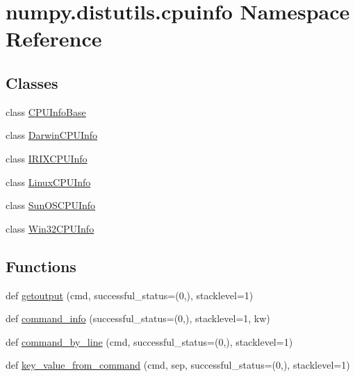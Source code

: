 \hypertarget{namespacenumpy_1_1distutils_1_1cpuinfo}{}\section{numpy.\+distutils.\+cpuinfo Namespace Reference}
\label{namespacenumpy_1_1distutils_1_1cpuinfo}
\subsection*{Classes}
\begin{DoxyCompactItemize}
\item 
class \hyperlink{classnumpy_1_1distutils_1_1cpuinfo_1_1CPUInfoBase}{C\+P\+U\+Info\+Base}
\item 
class \hyperlink{classnumpy_1_1distutils_1_1cpuinfo_1_1DarwinCPUInfo}{Darwin\+C\+P\+U\+Info}
\item 
class \hyperlink{classnumpy_1_1distutils_1_1cpuinfo_1_1IRIXCPUInfo}{I\+R\+I\+X\+C\+P\+U\+Info}
\item 
class \hyperlink{classnumpy_1_1distutils_1_1cpuinfo_1_1LinuxCPUInfo}{Linux\+C\+P\+U\+Info}
\item 
class \hyperlink{classnumpy_1_1distutils_1_1cpuinfo_1_1SunOSCPUInfo}{Sun\+O\+S\+C\+P\+U\+Info}
\item 
class \hyperlink{classnumpy_1_1distutils_1_1cpuinfo_1_1Win32CPUInfo}{Win32\+C\+P\+U\+Info}
\end{DoxyCompactItemize}
\subsection*{Functions}
\begin{DoxyCompactItemize}
\item 
def \hyperlink{namespacenumpy_1_1distutils_1_1cpuinfo_ae7352db161b2168010c670cbb63da285}{getoutput} (cmd, successful\+\_\+status=(0,), stacklevel=1)
\item 
def \hyperlink{namespacenumpy_1_1distutils_1_1cpuinfo_a89d1723389bda494601ebabd79451be1}{command\+\_\+info} (successful\+\_\+status=(0,), stacklevel=1, kw)
\item 
def \hyperlink{namespacenumpy_1_1distutils_1_1cpuinfo_aeb25608a6416293178e3a489a1bab11c}{command\+\_\+by\+\_\+line} (cmd, successful\+\_\+status=(0,), stacklevel=1)
\item 
def \hyperlink{namespacenumpy_1_1distutils_1_1cpuinfo_af90cb379126f1939f6762d97ae61e438}{key\+\_\+value\+\_\+from\+\_\+command} (cmd, sep, successful\+\_\+status=(0,), stacklevel=1)
\end{DoxyCompactItemize}
